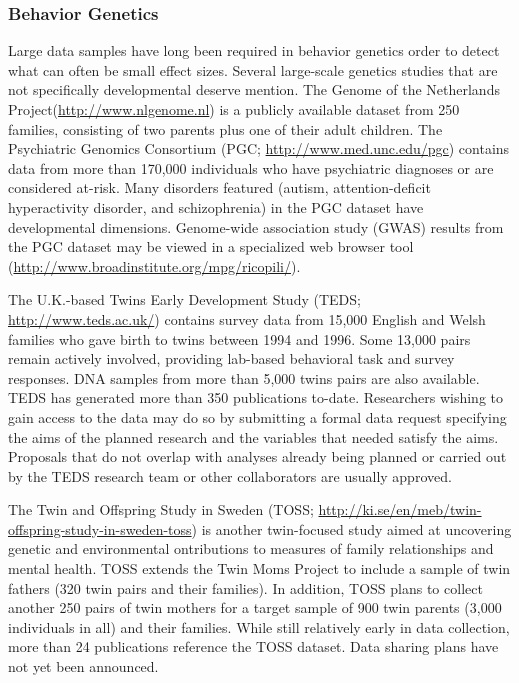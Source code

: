 \documentclass[letterpaper,man,apacite]{apa6}
\begin{document}
\subsubsection{Behavior Genetics}

Large data samples have long been required in behavior genetics order to detect what can often be small effect sizes.
Several large-scale genetics studies that are not specifically developmental deserve mention.
The Genome of the Netherlands Project(\url{http://www.nlgenome.nl}) is a publicly available dataset from 250 families, consisting of two parents plus one of their adult children.
The Psychiatric Genomics Consortium (PGC; \url{http://www.med.unc.edu/pgc}) contains data from more than 170,000 individuals who have psychiatric diagnoses or are considered at-risk.
Many disorders featured (autism, attention-deficit hyperactivity disorder, and schizophrenia) in the PGC dataset have developmental dimensions.
Genome-wide association study (GWAS) results from the PGC dataset may be viewed in a specialized web browser tool (\url{http://www.broadinstitute.org/mpg/ricopili/}).

The U.K.-based Twins Early Development Study (TEDS; \url{http://www.teds.ac.uk/}) contains survey data from 15,000 English and Welsh families who gave birth to twins between 1994 and 1996.
Some 13,000 pairs remain actively involved, providing lab-based behavioral task and survey responses.
DNA samples from more than 5,000 twins pairs are also available.
TEDS has generated more than 350 publications to-date.
Researchers wishing to gain access to the data may do so by submitting a formal data request specifying the aims of the planned research and the variables that needed satisfy the aims. 
Proposals that do not overlap with analyses already being planned or carried out by the TEDS research team or other collaborators are usually approved.

The Twin and Offspring Study in Sweden (TOSS; \url{http://ki.se/en/meb/twin-offspring-study-in-sweden-toss}) is another twin-focused study aimed at uncovering genetic and environmental ontributions to measures of family relationships and mental health.
TOSS extends the Twin Moms Project to include a sample of twin fathers (320 twin pairs and their families).
In addition, TOSS plans to collect another 250 pairs of twin mothers for a target sample of 900 twin parents (3,000 individuals in all) and their families.
While still relatively early in data collection, more than 24 publications reference the TOSS dataset.
Data sharing plans have not yet been announced.
\end{document}
